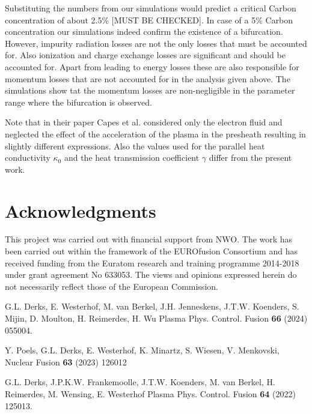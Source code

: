\documentclass[amsmath,amssymb,a4]{revtex4-2}
\begin{document}
{\begin{equation}
\end{equation}
Substituting the numbers from our simulations would predict a critical Carbon concentration of about 2.5\% [MUST BE CHECKED]. In case of a 5\% Carbon concentration our simulations indeed confirm the existence of a bifurcation. However, impurity radiation losses are not the only losses that must be accounted for. Also ionization and charge exchange losses are significant and should be accounted for. Apart from leading to energy losses these are also responsible for momentum losses that are not accounted for in the analysis given above. The simulations show tat the momentum losses are non-negligible in the parameter range where the bifurcation is observed.

Note that in their paper Capes et al. considered only the electron fluid and neglected the effect of the acceleration of the plasma in the presheath resulting in slightly different expressions. Also the values used for the parallel heat conductivity $\kappa_0$ and the heat transmission coefficient $\gamma$ differ from the present work.

\section*{Acknowledgments}
\noindent This project was carried out with financial support from NWO. The work has been carried out within the framework of the EUROfusion Consortium and has received funding from the Euratom research and training programme 2014-2018 under grant agreement No 633053. The views and opinions expressed herein do not necessarily reflect those of the European Commission.

\begin{thebibliography}{99}

G.L. Derks, E. Westerhof, M. {van Berkel}, J.H. Jenneskens, J.T.W. Koenders, S. Mijin, D. Moulton, H. Reimerdes, H. Wu  Plasma Phys. Control. Fusion {\bf 66} (2024) 055004.

Y. Poels, G.L. Derks, E. Westerhof, K. Minartz, S. Wiesen, V. Menkovski, Nuclear Fusion {\bf 63} (2023) 126012


G.L. Derks, J.P.K.W. Frankemo{\:o}lle, J.T.W. Koenders, M. {van Berkel}, H. Reimerdes, M. Wensing, E. Westerhof  Plasma Phys. Control. Fusion {\bf 64} (2022) 125013.


\end{thebibliography}}
\end{document}
